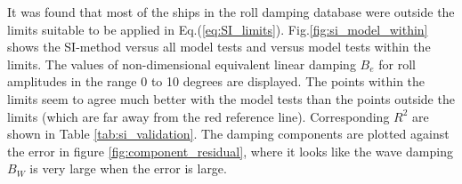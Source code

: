 It was found that most of the ships in the roll damping database were outside the limits suitable to be applied in Eq.(\ref{eq:SI_limits}). Fig.\ref{fig:si_model_within} shows the SI-method versus all model tests and versus model tests within the limits. The values of non-dimensional equivalent linear damping $B_e$ for roll amplitudes in the range 0 to 10 degrees are displayed. The points within the limits seem to agree much better with the model tests than the points outside the limits (which are far away from the red reference line). Corresponding $R^2$ are shown in Table \ref{tab:si_validation}. The damping components are plotted against the error in figure \ref{fig:component_residual}, where it looks like the wave damping $B_W$ is very large when the error is large. 



